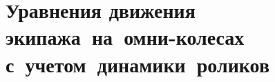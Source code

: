 \chapter[Уравнения движения экипажа на~омни-колесах с~учетом динамики роликов]{Уравнения движения \\ экипажа~на~омни-колесах \\ с~учетом~динамики~роликов}

